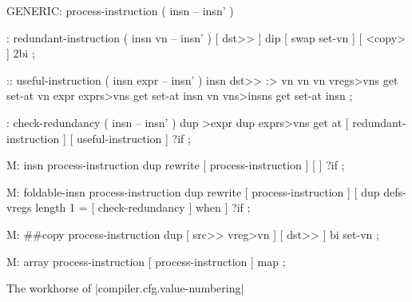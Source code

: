 \centering

  \begin{factorcode}
    GENERIC: process-instruction ( insn -- insn' )

    : redundant-instruction ( insn vn -- insn' )
        [ dst>> ] dip [ swap set-vn ] [ <copy> ] 2bi ;

    :: useful-instruction ( insn expr -- insn' )
        insn dst>> :> vn
        vn vn vregs>vns get set-at
        vn expr exprs>vns get set-at
        insn vn vns>insns get set-at
        insn ;

    : check-redundancy ( insn -- insn' )
        dup >expr dup exprs>vns get at
        [ redundant-instruction ] [ useful-instruction ] ?if ;

    M: insn process-instruction
        dup rewrite [ process-instruction ] [ ] ?if ;

    M: foldable-insn process-instruction
        dup rewrite
        [ process-instruction ]
        [ dup defs-vregs length 1 = [ check-redundancy ] when ] ?if ;

    M: ##copy process-instruction
        dup [ src>> vreg>vn ] [ dst>> ] bi set-vn ;

    M: array process-instruction
        [ process-instruction ] map ;
  \end{factorcode}

\caption{The workhorse of \factor|compiler.cfg.value-numbering|}
